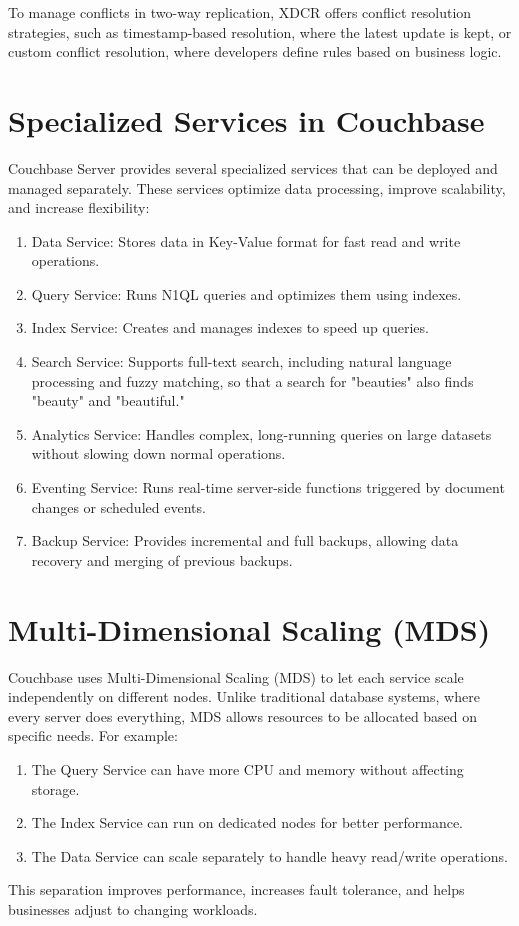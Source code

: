 To manage conflicts in two-way replication, XDCR offers conflict resolution strategies, such as timestamp-based resolution, where the latest update is kept, or custom conflict resolution, where developers define rules based on business logic.
\section{Specialized Services in Couchbase}
Couchbase Server provides several specialized services that can be deployed and managed separately. These services optimize data processing, improve scalability, and increase flexibility:
\begin{enumerate}
    \item Data Service: Stores data in Key-Value format for fast read and write operations.
    \item Query Service: Runs N1QL queries and optimizes them using indexes.
    \item Index Service: Creates and manages indexes to speed up queries.
    \item Search Service: Supports full-text search, including natural language processing and fuzzy matching, so that a search for "beauties" also finds "beauty" and "beautiful."
    \item Analytics Service: Handles complex, long-running queries on large datasets without slowing down normal operations.
    \item Eventing Service: Runs real-time server-side functions triggered by document changes or scheduled events.
    \item Backup Service: Provides incremental and full backups, allowing data recovery and merging of previous backups.
  \end{enumerate}

\cite{CouchbaseServices}
\section{Multi-Dimensional Scaling (MDS)}
Couchbase uses Multi-Dimensional Scaling (MDS) to let each service scale independently on different nodes. Unlike traditional database systems, where every server does everything, MDS allows resources to be allocated based on specific needs.
For example:

\begin{enumerate}
    \item The Query Service can have more CPU and memory without affecting storage.
    \item The Index Service can run on dedicated nodes for better performance.
    \item The Data Service can scale separately to handle heavy read/write operations.
  \end{enumerate}
This separation improves performance, increases fault tolerance, and helps businesses adjust to changing workloads.
\cite{CouchbaseMultiDimensionalScaling}

